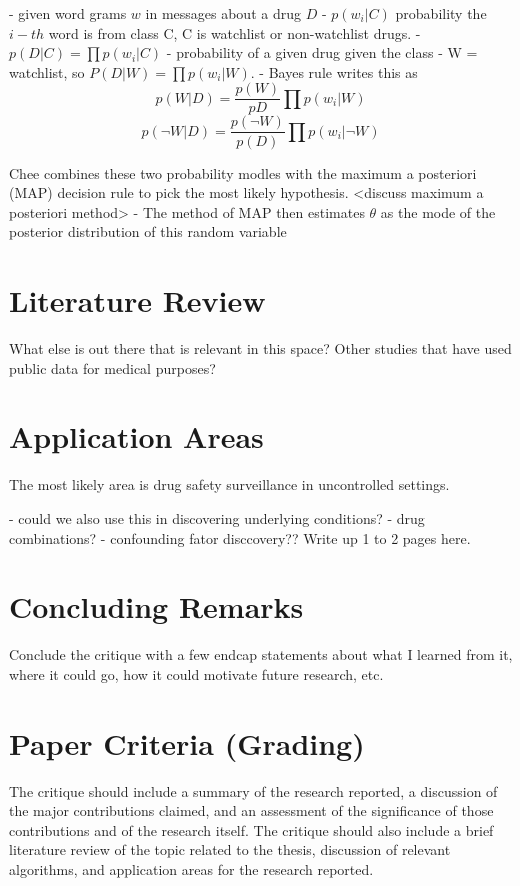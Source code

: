 \documentclass[twoside,11pt]{article}
\begin{document}
- given word grams $w$ in messages about a drug $D$
- $p(w_{i}|C)$ probability the $i-th$ word is from class C, C is watchlist or
non-watchlist drugs.
- $p(D|C) = \prod p(w_{i}|C)$ - probability of a given drug given the class
- W = watchlist, so $P(D|W) = \prod p(w_{i}|W)$.
- Bayes rule writes this as
\[
  p(W|D) = \frac{p(W)}{p{D}} \prod p(w_{i}|W)
\]
\[
  p(\neg{W}|D) = \frac{p(\neg{W})}{p(D)} \prod p(w_{i}|\neg{W})
\]

Chee combines these two probability modles with the maximum a posteriori (MAP)
decision rule to pick the most likely hypothesis.
<discuss maximum a posteriori method>
- The method of MAP then estimates $\theta$ as the mode of the posterior
distribution of this random variable


\section{Literature Review}
What else is out there that is relevant in this space?  Other studies
that have used public data for medical purposes?



\section{Application Areas}
The most likely area is drug safety surveillance in uncontrolled settings.

- could we also use this in discovering underlying conditions?
- drug combinations?
- confounding fator disccovery??
Write up 1 to 2 pages here.


\section{Concluding Remarks}
Conclude the critique with a few endcap statements about what I learned from it,
where it could go, how it could motivate future research, etc.


\section{Paper Criteria (Grading)}
The critique should include a summary of the research reported, a discussion of the major contributions
claimed, and an assessment of the significance of those contributions and of the research itself. The
critique should also include a brief literature review of the topic related to the thesis, discussion of relevant
algorithms, and application areas for the research reported.
\end{document}
